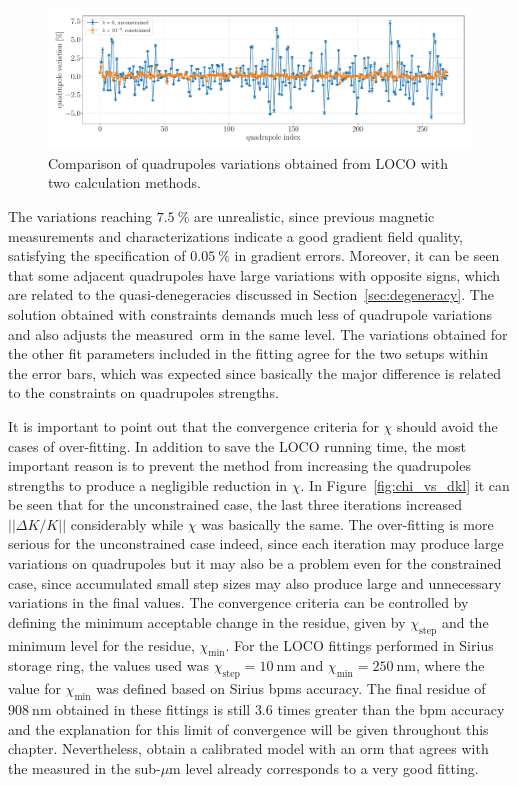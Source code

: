 \begin{figure}[h!]
\centering
\includegraphics[width=1.0\textwidth]{figures/delta_kl_comparison_better_grid.pdf}
\caption{Comparison of quadrupoles variations obtained from LOCO with two calculation methods.}
\label{fig:dkl_compare}
\end{figure}

The variations reaching $\SI{7.5}{\%}$ are unrealistic, since previous magnetic measurements and characterizations indicate a good gradient field quality, satisfying the specification of $\SI{0.05}{\%}$ in gradient errors. Moreover, it can be seen that some adjacent quadrupoles have large variations with opposite signs, which are related to the quasi-denegeracies discussed in Section~\ref{sec:degeneracy}. The solution obtained with constraints demands much less of quadrupole variations and also adjusts the measured~\gls{orm} in the same level. The variations obtained for the other fit parameters included in the fitting agree for the two setups within the error bars, which was expected since basically the major difference is related to the constraints on quadrupoles strengths.

It is important to point out that the convergence criteria for $\chi$ should avoid the cases of over-fitting. In addition to save the LOCO running time, the most important reason is to prevent the method from increasing the quadrupoles strengths to produce a negligible reduction in $\chi$. In Figure~\ref{fig:chi_vs_dkl} it can be seen that for the unconstrained case, the last three iterations increased $||\Delta K/K||$ considerably while $\chi$ was basically the same. The over-fitting is more serious for the unconstrained case indeed, since each iteration may produce large variations on quadrupoles but it may also be a problem even for the constrained case, since accumulated small step sizes may also produce large and unnecessary variations in the final values. The convergence criteria can be controlled by defining the minimum acceptable change in the residue, given by $\chi_{\mathrm{step}}$ and the minimum level for the residue, $\chi_{\mathrm{min}}$. For the LOCO fittings performed in Sirius storage ring, the values used was $\chi_{\mathrm{step}} = \SI{10}{\nano\meter}$ and $\chi_{\mathrm{min}} = \SI{250}{\nano\meter}$, where the value for $\chi_{\mathrm{min}}$ was defined based on Sirius \glspl{bpm} accuracy. The final residue of $\SI{908}{\nano\meter}$ obtained in these fittings is still $3.6$ times greater than the \gls{bpm} accuracy and the explanation for this limit of convergence will be given throughout this chapter. Nevertheless, obtain a calibrated model with an \gls{orm} that agrees with the measured in the sub-$\mu$m level already corresponds to a very good fitting.


